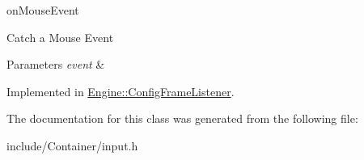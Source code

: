 on\+Mouse\+Event 

Catch a Mouse Event 
\begin{DoxyParams}{Parameters}
{\em event} & \\
\hline
\end{DoxyParams}


Implemented in \hyperlink{classEngine_1_1ConfigFrameListener_ac293a2b4c841a19e39d5e3d74eeb6ec3}{Engine\+::\+Config\+Frame\+Listener}.



The documentation for this class was generated from the following file\+:\begin{DoxyCompactItemize}
\item 
include/\+Container/input.\+h\end{DoxyCompactItemize}
